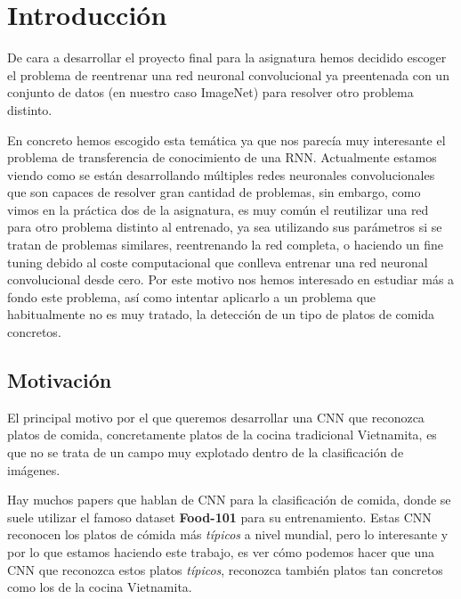 \section{Introducción}

De cara a desarrollar el proyecto final para la asignatura hemos decidido escoger el problema de reentrenar una red neuronal convolucional ya preentenada con un conjunto de datos (en nuestro caso ImageNet\cite{imagenet}) para resolver otro problema distinto.

En concreto hemos escogido esta temática ya que nos parecía muy interesante el problema de transferencia de conocimiento de una RNN. Actualmente estamos viendo como se están desarrollando múltiples redes neuronales convolucionales que son capaces de resolver gran cantidad de problemas, sin embargo, como vimos en la práctica dos de la asignatura, es muy común el reutilizar una red para otro problema distinto al entrenado, ya sea utilizando sus parámetros si se tratan de problemas similares, reentrenando la red completa, o haciendo un fine tuning debido al coste computacional que conlleva entrenar una red neuronal convolucional desde cero. Por este motivo nos hemos interesado en estudiar más a fondo este problema, así como intentar aplicarlo a un problema que habitualmente no es muy tratado, la detección de un tipo de platos de comida concretos.


\vspace{5 mm}

\subsection{Motivación}

\vspace{5 mm}

El principal motivo por el que queremos desarrollar una CNN que reconozca platos de comida, concretamente platos de la cocina tradicional Vietnamita, es que no se trata de un campo muy explotado dentro de la clasificación de imágenes.

\vspace{3 mm}

Hay muchos papers que hablan de CNN para la clasificación de comida, donde se suele utilizar el famoso dataset \textbf{Food-101}\cite{food101} para su entrenamiento. Estas CNN reconocen los platos de cómida más \textit{típicos} a nivel mundial, pero lo interesante y por lo que estamos haciendo este trabajo, es ver cómo podemos hacer que una CNN que reconozca estos platos \textit{típicos}, reconozca también platos tan concretos como los de la cocina Vietnamita.

